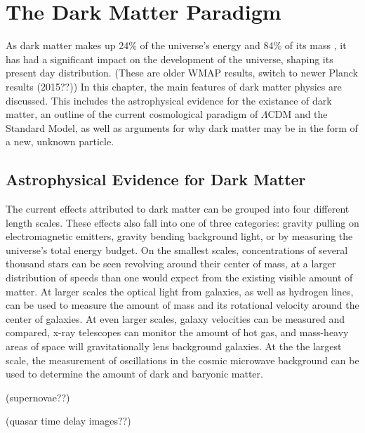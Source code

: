 \cleartooddpage[\thispagestyle{empty}]
\chapter{The Dark Matter Paradigm}

  As dark matter makes up 24\% of the universe's energy and 84\% of its mass \cite{wmap9year}, it has had a significant impact on the development of the universe, shaping its present day distribution.
  {\color{red}(These are older WMAP results, switch to newer Planck results (2015??))}
  In this chapter, the main features of dark matter physics are discussed.
  This includes the astrophysical evidence for the existance of dark matter, an outline of the current cosmological paradigm of $\Lambda$CDM and the Standard Model, as well as arguments for why dark matter may be in the form of a new, unknown particle.

\section{Astrophysical Evidence for Dark Matter}
  The current effects attributed to dark matter can be grouped into four different length scales.
  These effects also fall into one of three categories: gravity pulling on electromagnetic emitters, gravity bending background light, or by measuring the universe's total energy budget.
  On the smallest scales, concentrations of several thousand stars can be seen revolving around their center of mass, at a larger distribution of speeds than one would expect from the existing visible amount of matter.
  At larger scales the optical light from galaxies, as well as hydrogen lines, can be used to measure the amount of mass and its rotational velocity around the center of galaxies.
  At even larger scales, galaxy velocities can be measured and compared, x-ray telescopes can monitor the amount of hot gas, and mass-heavy areas of space will gravitationally lens background galaxies.
  At the the largest scale, the measurement of oscillations in the cosmic microwave background can be used to determine the amount of dark and baryonic matter.
  
  {\color{red}(supernovae??)}

  {\color{red}(quasar time delay images??)}

